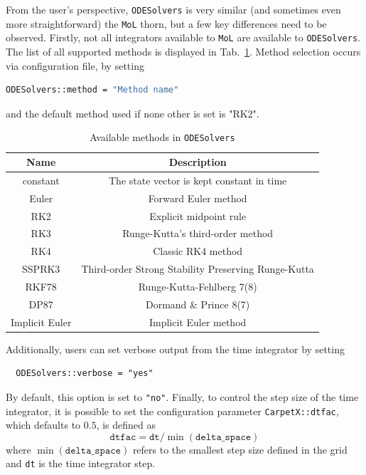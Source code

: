 From the user's perspective, \texttt{ODESolvers} is very similar (and sometimes even more straightforward) the \texttt{MoL} thorn, but a few key differences need to be observed. Firstly, not all integrators available to \texttt{MoL} are available to \texttt{ODESolvers}. The list of all supported methods is displayed in Tab.~\ref{tab:odesolvers_methods}. Method selection occurs via configuration file, by setting
%
\begin{lstlisting}[language=bash]
  ODESolvers::method = "Method name"
\end{lstlisting}
%
and the default method used if none other is set is "RK2".

\begin{table}[hb]
  \centering
  \begin{tabular}{cc}
  Name           & Description                                         \\ \hline\hline
  constant       & The state vector is kept constant in time           \\
  Euler          & Forward Euler method                                \\
  RK2            & Explicit midpoint rule                              \\
  RK3            & Runge-Kutta's third-order method                    \\
  RK4            & Classic RK4 method                                  \\
  SSPRK3         & Third-order Strong Stability Preserving Runge-Kutta \\
  RKF78          & Runge-Kutta-Fehlberg 7(8)                           \\
  DP87           & Dormand \& Prince 8(7)                              \\
  Implicit Euler & Implicit Euler method                               \\ \hline\hline
  \end{tabular}
  \caption{Available methods in \texttt{ODESolvers}}
  \label{tab:odesolvers_methods}
\end{table}

Additionally, users can set verbose output from the time integrator by setting
%
\begin{lstlisting}
  ODESolvers::verbose = "yes"
\end{lstlisting}
%
By default, this option is set to \texttt{"no"}. Finally, to control the step size of the time integrator, it is possible to set the configuration parameter \texttt{CarpetX::dtfac}, which defaults to $0.5$, is defined as
%
\begin{equation}
  \texttt{dtfac} = \texttt{dt}/\min(\texttt{delta\_space})
\end{equation}
%
where $\min(\texttt{delta\_space})$ refers to the smallest step size defined in the \CarpetX\space grid and \texttt{dt} is the time integrator step.

